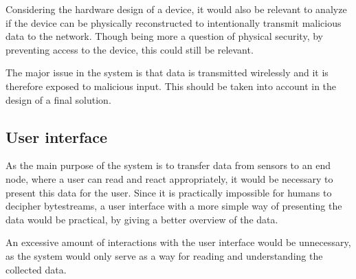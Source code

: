 Considering the hardware design of a device, it would also be relevant to analyze if the device can be physically reconstructed to intentionally transmit malicious data to the network. Though being more a question of physical security, by preventing access to the device, this could still be relevant.

The major issue in the system is that data is transmitted wirelessly and it is therefore exposed to malicious input. This should be taken into account in the design of a final solution.

\subsection{User interface}
As the main purpose of the system is to transfer data from sensors to an end node, where a user can read and react appropriately, it would be necessary to present this data for the user. Since it is practically impossible for humans to decipher bytestreams, a user interface with a more simple way of presenting the data would be practical, by giving a better overview of the data.

An excessive amount of interactions with the user interface would be unnecessary, as the system would only serve as a way for reading and understanding the collected data.
